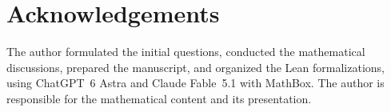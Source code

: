 \section*{Acknowledgements}
The author formulated the initial questions, conducted the mathematical
discussions, prepared the manuscript, and organized the Lean
formalizations, using ChatGPT~6 Astra and Claude Fable~5.1 with MathBox.
The author is responsible for the mathematical content and its
presentation.


